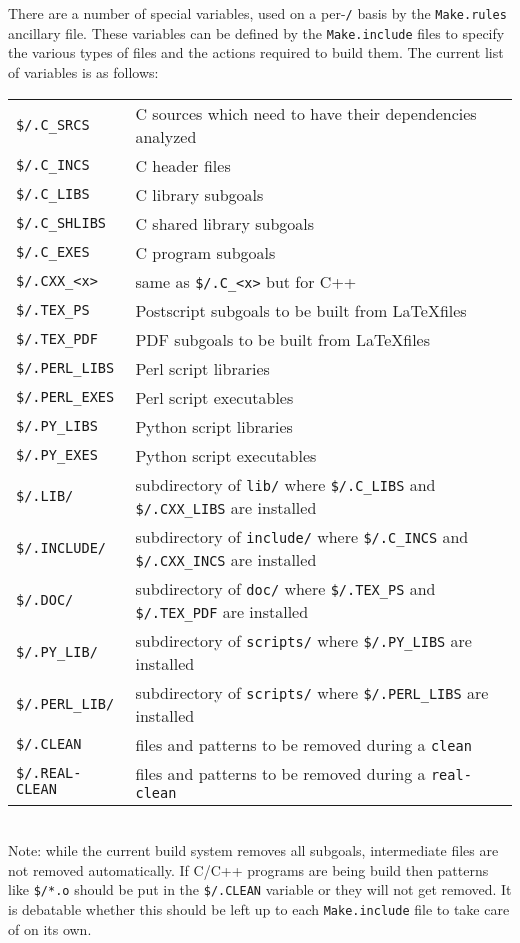 \documentclass[letterpaper]{article}
\begin{document}
There are a number of special variables, used on a per-\verb+/+
basis by the \verb+Make.rules+ ancillary file.  These variables can
be defined by the \verb+Make.include+ files to specify the various
types of files and the actions required to build them.  The current
list of variables is as follows:\\
\begin{tabular}{ll}
\verb+$/.C_SRCS+ & C sources which need to have their dependencies analyzed\\
\verb+$/.C_INCS+ & C header files\\
\verb+$/.C_LIBS+ & C library subgoals\\
\verb+$/.C_SHLIBS+ & C shared library subgoals\\
\verb+$/.C_EXES+ & C program subgoals\\
\verb+$/.CXX_<x>+ & same as \verb+$/.C_<x>+ but for C++\\
\verb+$/.TEX_PS+ & Postscript subgoals to be built from \LaTeX files\\
\verb+$/.TEX_PDF+ & PDF subgoals to be built from \LaTeX files\\
\verb+$/.PERL_LIBS+ & Perl script libraries\\
\verb+$/.PERL_EXES+ & Perl script executables\\
\verb+$/.PY_LIBS+ & Python script libraries\\
\verb+$/.PY_EXES+ & Python script executables\\
\verb+$/.LIB/+  & subdirectory of \verb+lib/+ where \verb+$/.C_LIBS+ and \verb+$/.CXX_LIBS+ are installed\\
\verb+$/.INCLUDE/+  & subdirectory of \verb+include/+ where \verb+$/.C_INCS+ and \verb+$/.CXX_INCS+ are installed\\
\verb+$/.DOC/+  & subdirectory of \verb+doc/+ where \verb+$/.TEX_PS+ and \verb+$/.TEX_PDF+ are installed\\
\verb+$/.PY_LIB/+  & subdirectory of \verb+scripts/+ where \verb+$/.PY_LIBS+ are installed\\
\verb+$/.PERL_LIB/+  & subdirectory of \verb+scripts/+ where \verb+$/.PERL_LIBS+ are installed\\
\verb+$/.CLEAN+ & files and patterns to be removed during a \verb+clean+\\
\verb+$/.REAL-CLEAN+ & files and patterns to be removed during a \verb+real-clean+\\
\end{tabular}\\
Note: while the current build system removes all subgoals, intermediate
files are not removed automatically.  If C/C++ programs are being build
then patterns like \verb+$/*.o+ should be put in the \verb+$/.CLEAN+ variable
or they will not get removed.  It is debatable whether this should be left
up to each \verb+Make.include+ file to take care of on its own.
\end{document}
